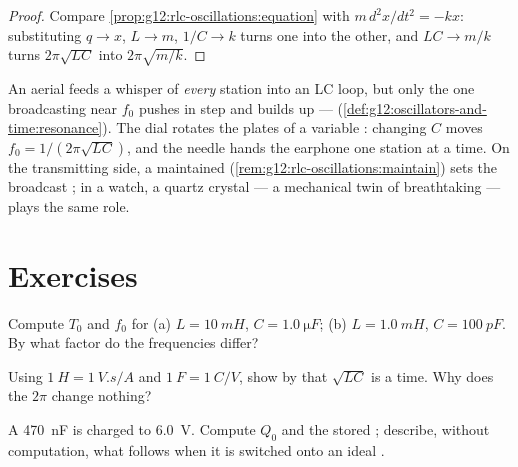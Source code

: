 \begin{proof}
Compare \cref{prop:g12:rlc-oscillations:equation} with
$m\,d^2x/dt^2 = -kx$: substituting $q \to x$, $L \to m$, $1/C \to k$
turns one into the other, and $LC \to m/k$ turns
$2\pi\sqrt{LC}$ into $2\pi\sqrt{m/k}$.
\end{proof}

\begin{example}\label{ex:g12:rlc-oscillations:tuning}
An aerial feeds a whisper of \emph{every} station into an LC loop, but
only the one broadcasting near $f_0$ pushes in step and builds up ---
 (\cref{def:g12:oscillators-and-time:resonance}). The dial
rotates the plates of a variable : changing $C$ moves
$f_0 = 1/(2\pi\sqrt{LC})$, and the needle hands the earphone one
station at a time. On the transmitting side, a maintained 
(\cref{rem:g12:rlc-oscillations:maintain}) sets the broadcast
; in a watch, a quartz crystal --- a mechanical twin of
breathtaking  --- plays the same role.
\end{example}

\section{Exercises}

\begin{exercise}[$\star$]\label{exo:g12:rlc-oscillations:1}
Compute $T_0$ and $f_0$ for (a) $L = \qty{10}{mH}$,
$C = \qty{1.0}{\micro F}$; (b) $L = \qty{1.0}{mH}$,
$C = \qty{100}{pF}$. By what factor do the frequencies differ?
\end{exercise}

\begin{exercise}[$\star$]\label{exo:g12:rlc-oscillations:2}
Using $\qty{1}{H} = \qty{1}{V.s/A}$ and $\qty{1}{F} = \qty{1}{C/V}$,
show  by  that $\sqrt{LC}$ is a time. Why does the $2\pi$
change nothing?
\end{exercise}

\begin{exercise}[$\star$]\label{exo:g12:rlc-oscillations:3}
A \qty{470}{nF}  is charged to \qty{6.0}{V}. Compute $Q_0$
and the stored ; describe, without computation, what follows
when it is switched onto an ideal .
\end{exercise}

